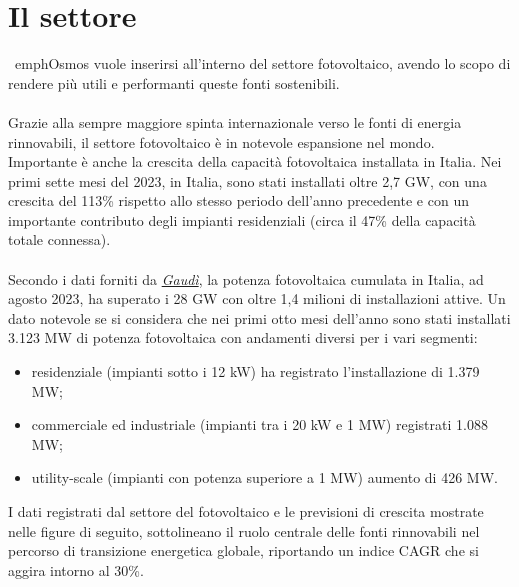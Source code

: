 \documentclass[a4paper, 12pt]{article}
\begin{document}
	\section{Il settore}
	\ emph{Osmos} vuole inserirsi all'interno del settore fotovoltaico, avendo lo scopo di rendere più utili e performanti queste fonti sostenibili.\\\\
	Grazie alla sempre maggiore spinta internazionale verso le fonti di energia rinnovabili, il settore fotovoltaico è in notevole espansione nel mondo.\\
	Importante è anche la crescita della capacità fotovoltaica installata in Italia. Nei primi sette mesi del 2023, in Italia, sono stati installati oltre 2,7 GW, con una crescita del 113\% rispetto allo stesso periodo dell'anno precedente e con un importante contributo degli impianti residenziali (circa il 47\% della capacità totale connessa).\\\\
	Secondo i dati forniti da \href{https://www.terna.it/it/sistema-elettrico/dispacciamento/fonti-rinnovabili}{\emph{Gaudì}}, la potenza fotovoltaica cumulata in Italia, ad agosto 2023, ha superato i 28 GW con oltre 1,4 milioni di installazioni attive. Un dato notevole se si considera che nei primi otto mesi dell'anno sono stati installati 3.123 MW di potenza fotovoltaica con andamenti diversi per i vari segmenti:
	\begin{itemize}
		\item residenziale (impianti sotto i 12 kW) ha registrato l'installazione di 1.379 MW;
		\item commerciale ed industriale (impianti tra i 20 kW e 1 MW) registrati 1.088 MW;
		\item utility-scale (impianti con potenza superiore a 1 MW) aumento di 426 MW.
	\end{itemize}
	I dati registrati dal settore del fotovoltaico e le previsioni di crescita mostrate nelle figure di seguito, sottolineano il ruolo centrale delle fonti rinnovabili nel percorso di transizione energetica globale, riportando un indice CAGR che si aggira intorno al 30\%.
\end{document}
